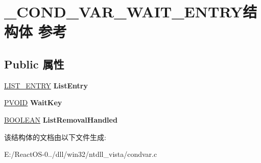 \hypertarget{struct___c_o_n_d___v_a_r___w_a_i_t___e_n_t_r_y}{}\section{\+\_\+\+C\+O\+N\+D\+\_\+\+V\+A\+R\+\_\+\+W\+A\+I\+T\+\_\+\+E\+N\+T\+R\+Y结构体 参考}
\label{struct___c_o_n_d___v_a_r___w_a_i_t___e_n_t_r_y}
\subsection*{Public 属性}
\begin{DoxyCompactItemize}
\item 
\mbox{\label{struct___c_o_n_d___v_a_r___w_a_i_t___e_n_t_r_y_a4957a92c98404872fc524a554b82d890}} 
\hyperlink{struct___l_i_s_t___e_n_t_r_y}{L\+I\+S\+T\+\_\+\+E\+N\+T\+RY} {\bfseries List\+Entry}
\item 
\mbox{\label{struct___c_o_n_d___v_a_r___w_a_i_t___e_n_t_r_y_acbf36e8f11b195fbc944215543329e54}} 
\hyperlink{interfacevoid}{P\+V\+O\+ID} {\bfseries Wait\+Key}
\item 
\mbox{\label{struct___c_o_n_d___v_a_r___w_a_i_t___e_n_t_r_y_a13e6fdac10c75eb56cbf3dc6c8143645}} 
\hyperlink{_processor_bind_8h_a112e3146cb38b6ee95e64d85842e380a}{B\+O\+O\+L\+E\+AN} {\bfseries List\+Removal\+Handled}
\end{DoxyCompactItemize}


该结构体的文档由以下文件生成\+:\begin{DoxyCompactItemize}
\item 
E\+:/\+React\+O\+S-\/0../dll/win32/ntdll\+\_\+vista/condvar.\+c\end{DoxyCompactItemize}
